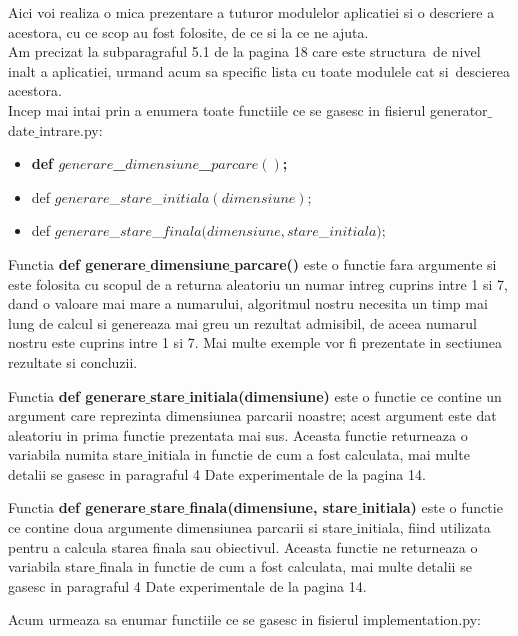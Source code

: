 \documentclass{article}
\begin{document}
\begin{flushleft}
\quad Aici voi realiza o mica prezentare a tuturor modulelor aplicatiei si o descriere a acestora, cu ce scop au fost folosite, de ce si la ce ne ajuta.\\
Am precizat la subparagraful 5.1 de la pagina 18 care este structura\ de nivel inalt a aplicatiei, urmand acum sa specific lista cu toate modulele cat si\ descierea  acestora.\\
Incep mai intai prin a enumera toate functiile ce se gasesc in fisierul generator$\_$date$\_$intrare.py:
\begin{itemize}
  \item \bfseries{def $generare$\_$dimensiune$\_$parcare()$;}
  \item def $generare$\_$stare$\_$initiala(dimensiune)$;
  \item def $generare$\_$stare$\_$finala(dimensiune, stare$\_$initiala)$;
\end{itemize}
\vspace{2mm}
\quad Functia \textbf{def generare$\_$dimensiune$\_$parcare()} este o functie fara argumente si este folosita cu scopul de a returna aleatoriu un numar intreg cuprins intre 1 si 7, dand o valoare mai mare a numarului, algoritmul nostru necesita un timp mai lung de calcul si genereaza mai greu un rezultat admisibil, de aceea numarul nostru este cuprins intre 1 si 7. Mai multe exemple vor fi prezentate in sectiunea rezultate si concluzii. \par
\quad Functia \textbf{def generare$\_$stare$\_$initiala(dimensiune)} este o functie ce contine un argument care reprezinta dimensiunea parcarii noastre; acest argument este dat aleatoriu in prima functie prezentata mai sus. Aceasta functie returneaza o variabila
numita stare$\_$initiala in functie de cum a fost calculata, mai multe detalii se gasesc in paragraful 4 Date experimentale de la pagina 14.\par
\quad Functia \textbf{def generare$\_$stare$\_$finala(dimensiune, stare$\_$initiala)} este o functie ce contine doua argumente dimensiunea parcarii si stare$\_$initiala, fiind utilizata pentru a calcula starea finala sau obiectivul. Aceasta functie ne returneaza o variabila stare$\_$finala in functie de cum a fost calculata, mai multe detalii se gasesc in paragraful 4 Date experimentale de la pagina 14.\par
\vspace{8mm}
Acum urmeaza sa enumar functiile ce se gasesc in fisierul implementation.py:
\begin{itemize}

\end{itemize}
\end{flushleft}
\end{document}
